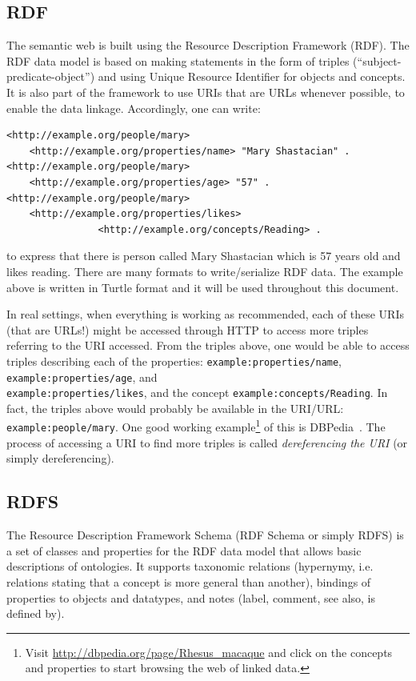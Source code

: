 \documentclass[12pt,fleqn]{article}
\begin{document}
\subsection{RDF}
The semantic web is built using the Resource Description Framework (RDF).
The RDF data model is based on making statements in the form of triples
(``subject-predicate-object'') and using Unique Resource Identifier for
objects and concepts.
It is also part of the framework to use URIs that are URLs whenever possible,
to enable the data linkage.
Accordingly, one can write:

\begin{Verbatim}[fontsize=\footnotesize]
<http://example.org/people/mary>
	<http://example.org/properties/name> "Mary Shastacian" .
<http://example.org/people/mary>
	<http://example.org/properties/age> "57" .
<http://example.org/people/mary> 
	<http://example.org/properties/likes> 
                <http://example.org/concepts/Reading> .
\end{Verbatim}
\noindent to express that there is person called Mary Shastacian which is 57 years old and likes reading.
There are many formats to write/serialize RDF data.
The example above is written in Turtle format and it will be used throughout this document.

In real settings, when everything is working as recommended,
each of these URIs (that are URLs!) might be accessed 
through HTTP to access more triples referring to the URI accessed.
From the triples above, one would be able to access triples
describing each of the properties: \texttt{example:properties/name}, \texttt{example:properties/age}, and\\
\texttt{example:properties/likes},
and the concept \texttt{example:concepts/Reading}.
In fact, the triples above would probably be available in the URI/URL:
\texttt{example:people/mary}.
One good working example\footnote{Visit \url{http://dbpedia.org/page/Rhesus_macaque}
and click on the concepts and properties to start browsing the web of linked data.}
of this is DBPedia~\citep{dbpedia}.
The process of accessing a URI to find more triples is called \emph{dereferencing the URI} (or simply dereferencing).

\subsection{RDFS}
The Resource Description Framework Schema (RDF Schema or simply RDFS)
is a set of classes and properties for the RDF data model that allows
basic descriptions of ontologies.
It supports taxonomic relations (hypernymy, i.e. relations stating that a concept is more general than another),
bindings of properties to objects and datatypes, and notes (label, comment, see also, is defined by).
\end{document}
